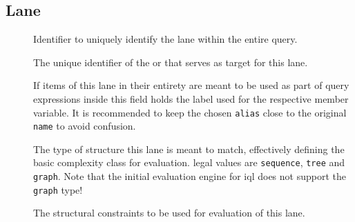 \documentclass[11pt,a4paper]{article}
\begin{document}
\subsection{Lane}
\label{sec:json-ld-lane}
\begin{attributes}{}
\end{attributes}
\begin{description}
	\item[] Identifier to uniquely identify the lane within the entire query.
	\item[] The unique identifier of the  or  that serves as target for this lane.
	\item[] If items of this lane in their entirety are meant to be used as part of query expressions inside this field holds the label used for the respective member variable. It is recommended to keep the chosen \texttt{alias} close to the original \texttt{name} to avoid confusion.
	\item[] The type of structure this lane is meant to match, effectively defining the basic complexity class for evaluation. legal values are \texttt{sequence}, \texttt{tree} and \texttt{graph}. Note that the initial evaluation engine for \ac{iql} does not support the \texttt{graph} type! %
\end{description}
\begin{elements}{}
\end{elements}
\begin{description}
	\item[] The structural constraints to be used for evaluation of this lane.
\end{description}
\end{document}
